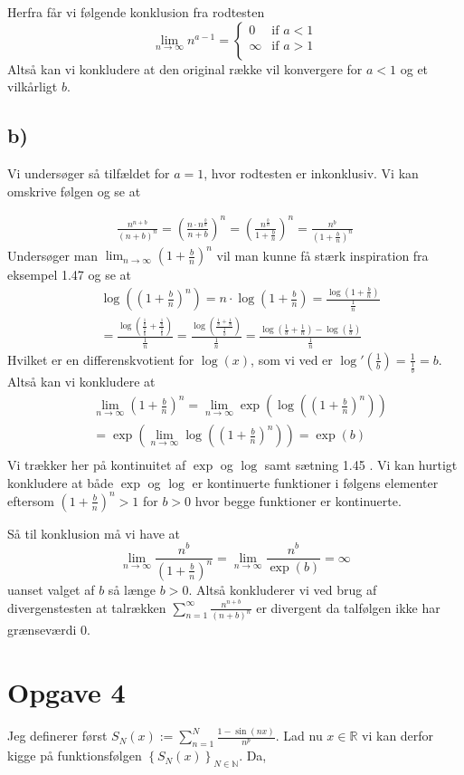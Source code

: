 \documentclass{article}
\newcommand{\m}[1]{\mathbb{#1}}
\newcommand{\mR}{\m{R}}
\newcommand{\mN}{\m{N}}
\newcommand{\lr}[1]{\left( #1\right)}
\newcommand{\lrc}[1]{\left\{ #1\right\}}
\begin{document}
Herfra får vi følgende konklusion fra rodtesten
\[
    \lim_{n \to \infty} n^{a-1} = 
    \begin{cases}
    0 & \text{if } a < 1 \\
    \infty & \text{if } a > 1 \\
    \end{cases}
\]
Altså kan vi konkludere at den original række
vil konvergere for $a < 1$ og et vilkårligt $b$.
\subsection*{b)}
Vi undersøger så tilfældet for $a = 1$, hvor rodtesten er inkonklusiv.
Vi kan omskrive følgen og se at

\begin{align*}
\frac{n^{n+b}}{(n+b)^n} 
=\lr{\frac{n \cdot n^{\frac{b}{n}}}{n+b}}^n
=\lr{\frac{n^{\frac{b}{n}}}{1+\frac{b}{n}}}^n
=\frac{n^b}{\lr{1+\frac{b}{n}}^n}
\end{align*}
Undersøger man $\lim_{n \to \infty} (1+ \frac{b}{n})^n$ vil man kunne få stærk inspiration fra eksempel 1.47 \cite{an1}
og se at 
\begin{align*}
    &\log\lr{(1+ \frac{b}{n})^n}
    = n \cdot \log(1+ \frac{b}{n}) 
    = \frac{\log(1+ \frac{b}{n})}{\frac{1}{n}} \\
    &= \frac{\log\lr{\frac{\frac{1}{b}}{\frac{1}{b}} + \frac{\frac{1}{n}}{\frac{1}{b}}}}{\frac{1}{n}}
    = \frac{\log\lr{\frac{\frac{1}{b} + \frac{1}{n}}{\frac{1}{b}}}}{\frac{1}{n}}
    = \frac{\log\lr{\frac{1}{b} + \frac{1}{n}} - \log \lr{\frac{1}{b}}}{\frac{1}{n}}
\end{align*}
Hvilket er en differenskvotient for $\log(x)$, som vi ved er $\log'(\frac{1}{b}) = \frac{1}{\frac{1}{b}} = b$.
Altså kan vi konkludere at 
\begin{align*}
&\lim_{n \to \infty} (1+ \frac{b}{n})^n
=\lim_{n \to \infty} \exp \lr{\log \lr{(1+ \frac{b}{n})^n}}  \\
&=\exp \lr{\lim_{n \to \infty} \log \lr{(1+ \frac{b}{n})^n}} 
=\exp \lr{b}  \\
\end{align*}
Vi trækker her på kontinuitet af $\exp$ og $\log$ samt sætning 1.45 \cite{an1}. 
Vi kan hurtigt konkludere at både $\exp$ og $\log$ er kontinuerte funktioner i følgens elementer
eftersom $(1+\frac{b}{n})^n > 1$ for $b>0$ hvor begge funktioner er kontinuerte.

Så til konklusion må vi have at 
\[
    \lim_{n \to \infty} \frac{n^b}{\lr{1+\frac{b}{n}}^n} 
    = \lim_{n \to \infty} \frac{n^b}{\exp(b)} = \infty
\]
uanset valget af $b$ så længe $b>0$. Altså konkluderer vi ved brug af 
divergenstesten \cite[sætning 2.2]{an1} at talrækken $\sum_{n=1}^\infty \frac{n^{n+b}}{(n+b)^n}$ 
er divergent da talfølgen ikke har grænseværdi $0$.

\section*{Opgave 4}
Jeg definerer først $S_N(x) := \sum_{n=1}^N \frac{1 - \sin(nx)}{n^p}$.
Lad nu $x \in \mR$ vi kan derfor kigge på funktionsfølgen $\lrc{S_N(x)}_{N \in \mN}$.
Da, 



\end{document}

